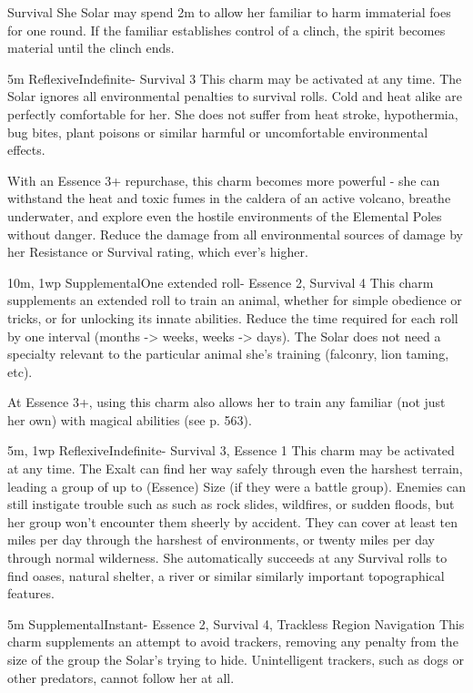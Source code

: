 \begin{Ability}{Survival}
  She Solar may spend 2m to allow her familiar to harm immaterial foes for one round. If the familiar establishes control of a clinch, the spirit becomes material until the clinch ends.

  {5m}
  {Reflexive}{Indefinite}{-}
  {Survival 3}
  This charm may be activated at any time. The Solar ignores all environmental penalties to survival rolls. Cold and heat alike are perfectly comfortable for her. She does not suffer from heat stroke, hypothermia, bug bites, plant poisons or similar harmful or uncomfortable environmental effects.

  With an Essence 3+ repurchase, this charm becomes more powerful - she can withstand the heat and toxic fumes in the caldera of an active volcano, breathe underwater, and explore even the hostile environments of the Elemental Poles without danger. Reduce the damage from all environmental sources of damage by her Resistance or Survival rating, which ever's higher.

  {10m, 1wp}
  {Supplemental}{One extended roll}{-}
  {Essence 2, Survival 4}
  This charm supplements an extended roll to train an animal, whether for simple obedience or tricks, or for unlocking its innate abilities. Reduce the time required for each roll by one interval (months -> weeks, weeks -> days). The Solar does not need a specialty relevant to the particular animal she's training (falconry, lion taming, etc).

  At Essence 3+, using this charm also allows her to train any familiar (not just her own) with magical abilities (see p. 563).

  {5m, 1wp}
  {Reflexive}{Indefinite}{-}
  {Survival 3, Essence 1}
  This charm may be activated at any time. The Exalt can find her way safely through even the harshest terrain, leading a group of up to (Essence) Size (if they were a battle group). Enemies can still instigate trouble such as such as rock slides, wildfires, or sudden floods, but her group won't encounter them sheerly by accident. They can cover at least ten miles per day through the harshest of environments, or twenty miles per day through normal wilderness. She automatically succeeds at any Survival rolls to find oases, natural shelter, a river or similar similarly important topographical features.

  {5m}
  {Supplemental}{Instant}{-}
  {Essence 2, Survival 4, Trackless Region Navigation}
  This charm supplements an attempt to avoid trackers, removing any penalty from the size of the group the Solar's trying to hide. Unintelligent trackers, such as dogs or other predators, cannot follow her at all.


\end{Ability}
